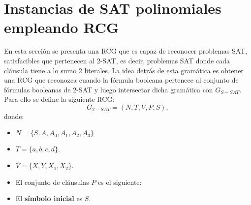 \section{Instancias de SAT polinomiales empleando RCG}

En esta sección se presenta una RCG que es capaz de reconocer problemas SAT, satisfacibles que pertenecen
al 2-SAT, es decir, problemas SAT donde cada cláusula tiene a lo sumo 2 literales. La idea detrás de esta
gramática es obtener una RCG que reconozca cuando la fórmula booleana pertenece al conjunto
de fórmulas booleanas de 2-SAT y luego intersectar dicha gramática con $G_{S-SAT}$.  Para ello se define la siguiente RCG:
\[
    G_{2-SAT} = (N, T, V, P, S),
\]
donde:

\begin{itemize}
    \item $N=\{S,A,A_0,A_1,A_2,A_3\}$
    \item $T=\{a,b,c,d\}$.
    \item $V=\{X,Y,X_1,X_2\}$.
    \item El conjunto de cláusulas $P$ es el siguiente:
          \begin{enumerate}
          \end{enumerate}
    \item El \textbf{símbolo inicial} es $S$.
\end{itemize}

